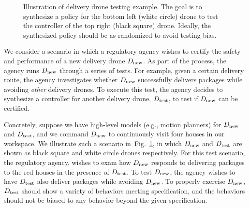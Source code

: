 
\begin{figure}
  \centering {}
  \caption{ Illustration of delivery drone testing example. The goal
    is to synthesize a policy for the bottom left (white circle) drone
    to test the controller of the top right (black square) drone. Ideally,
    the synthesized policy should be as randomized to avoid testing bias.\label{fig:motivating} }
\end{figure}

We consider a scenario in which a regulatory agency
wishes to certify the safety and performance of a new delivery drone ${D_{\text{new}}}$.
As part of the process, the agency runs ${D_{\text{new}}}$ through a series of tests. For example, given a certain
delivery route, the agency investigates whether ${D_{\text{new}}}$ successfully delivers packages while
avoiding \emph{other} delivery drones. To execute this test, the agency decides to
synthesize a controller for another delivery drone, ${D_{\text{test}}}$, to test if
${D_{\text{new}}}$ can be certified.

Concretely, suppose we have high-level models (e.g., motion planners)
for ${D_{\text{new}}}$ and ${D_{\text{test}}}$, and we command
${D_{\text{new}}}$ to continuously visit four houses in our workspace. We
illustrate such a scenario in~Fig.~\ref{fig:motivating}, in which
${D_{\text{new}}}$ and ${D_{\text{test}}}$ are shown as black square and white circle
drones respectively.  For this test scenario, the regulatory agency,
wishes to exam how ${D_{\text{new}}}$ responds to delivering packages to the
red houses in the presence of ${D_{\text{test}}}$. To test ${D_{\text{new}}}$, the
agency wishes to have ${D_{\text{test}}}$ also deliver packages while avoiding
${D_{\text{new}}}$. 
To properly exercise ${D_{\text{new}}}$, ${D_{\text{test}}}$ should show a variety of behaviors meeting  specification, and the behaviors should not be biased to any behavior beyond the given specification.  

